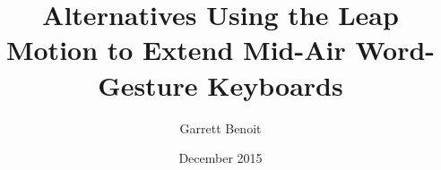 \documentclass
[
]
{thesis}
\title{Alternatives Using the Leap Motion to Extend Mid-Air Word-Gesture Keyboards}
\author{Garrett Benoit}
\date{December 2015}
\begin{document}
	
	
	
	
	
	
	
	
	\thesisAppendixPage 
	\begin{appendices}
		
		
		
		
	\end{appendices}
	
	
	
\end{document}
